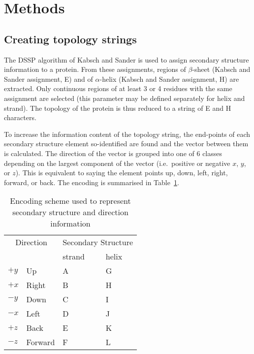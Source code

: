 \documentclass{article}
\begin{document}
\section{Methods}
\subsection{Creating topology strings}
The DSSP algorithm of Kabsch and Sander is used to assign secondary
structure information to a protein. From these assignments, regions of
$\beta$-sheet (Kabsch and Sander assignment, E) and of $\alpha$-helix
(Kabsch and Sander assignment, H) are extracted. Only continuous
regions of at least 3 or 4 residues with the same assignment are
selected (this parameter may be defined separately for helix and
strand). The topology of the protein is thus reduced to a string of E
and H characters.

To increase the information content of the topology string, the
end-points of each secondary structure element so-identified are found
and the vector between them is calculated. The direction of the vector
is grouped into one of 6 classes depending on the largest component of
the vector (i.e.\ positive or negative $x$, $y$, or $z$). This is
equivalent to saying the element points up, down, left, right, forward,
or back. The encoding is summarised in Table~\ref{tab:encoding}.

\begin{table}
\begin{center}
\begin{tabular}{llll} \hline
\multicolumn{2}{c}{Direction} & \multicolumn{2}{c}{Secondary Structure}\\ \cline{3-4}
          &         & strand & helix  \\ \hline
$+y$      & Up      & A      & G      \\
$+x$      & Right   & B      & H      \\
$-y$      & Down    & C      & I      \\
$-x$      & Left    & D      & J      \\
$+z$      & Back    & E      & K      \\
$-z$      & Forward & F      & L      \\ \hline
\end{tabular}
\end{center}
\caption{\label{tab:encoding}Encoding scheme used to represent
          secondary structure and direction information}
\end{table}
\end{document}
